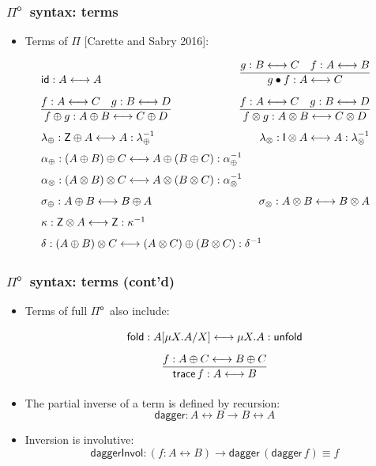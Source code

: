 \documentclass[12pt,t]{beamer}
\newcommand{\Pio}{\ensuremath{\mathsf{\Pi}^{\mathsf{o}}}}
\newcommand{\id}{\mathsf{id}}
\newcommand{\lr}{\longleftrightarrow}
\newcommand{\fold}{\mathsf{fold}}
\newcommand{\unfold}{\mathsf{unfold}}
\newcommand{\trace}{\ensuremath{\mathsf{trace}}}
\newcommand{\Z}{\mathsf{Z}}
\newcommand{\I}{\mathsf{I}}
\renewcommand{\dagger}{\mathsf{dagger}}
\begin{document}
\begin{frame}

  \frametitle{\Pio\ syntax: terms}
  \begin{itemize}
  \item Terms of $\Pi$ [Carette and Sabry 2016]:

  \end{itemize}
  \small
  \[
  \arraycolsep=-10pt\def\arraystretch{1.6}
  \begin{array}{lr}%
    \id : A \lr A
    & \infer{g \bullet f : A \lr C}{g : B \lr C & f : A \lr B} \\ [.25cm]
    \infer{f \oplus g : A \oplus B \lr C \oplus D}{f : A \lr C & g : B \lr D} 
    & \infer{f \otimes g : A \otimes B \lr C \otimes D}{f : A \lr C & g : B \lr D} \\
    \lambda_{\oplus} : \Z \oplus A \lr A : \lambda_{\oplus}^{-1}
    & \lambda_{\otimes} : \I \otimes A \lr A : \lambda_{\otimes}^{-1} \\
      \alpha_{\oplus} : (A \oplus B) \oplus C \lr A \oplus (B \oplus C) : \alpha_{\oplus}^{-1} \\
      \alpha_{\otimes} : (A \otimes B) \otimes C \lr A \otimes (B \otimes C) : \alpha_{\otimes}^{-1} \\
    \sigma_{\oplus} : A \oplus B \lr B \oplus A
    & \sigma_{\otimes} : A \otimes B \lr B \otimes A \\
    \kappa : \Z \otimes A \lr \Z : \kappa^{-1}  \\
     \delta : (A \oplus B) \otimes C \lr (A \otimes C) \oplus (B \otimes C) : \delta^{-1}
  \end{array}
  \]
\end{frame}
  
\begin{frame}

  \frametitle{\Pio\ syntax: terms (cont'd)}
  \begin{itemize}
  \item Terms of full \Pio\ also include:
    \[
    \def\arraystretch{1.6}  
    \begin{array}{c}
      \fold : A[\mu X.A/X] \lr \mu X.A : \unfold \\[.25cm]
      \infer{\trace \,f: A \lr B}{f : A \oplus C \lr B \oplus C}
    \end{array}
    \]
  \item The partial inverse of a term is defined by recursion:
    \[
    \dagger : A \lr B \to B \lr A    
    \]
  \item Inversion is involutive:
    \[
    \mathsf{daggerInvol} : (f : A \lr B) \to \dagger \,(\dagger\,f) \equiv f
    \]
  \end{itemize}
\end{frame}
\end{document}

